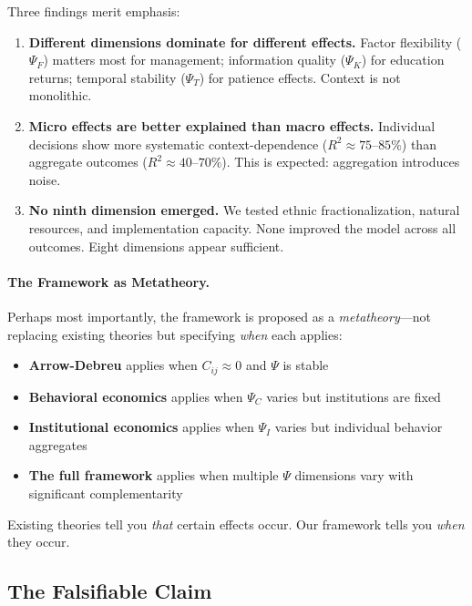 Three findings merit emphasis:
\begin{enumerate}
    \item \textbf{Different dimensions dominate for different effects.} Factor flexibility ($\Psi_F$) matters most for management; information quality ($\Psi_K$) for education returns; temporal stability ($\Psi_T$) for patience effects. Context is not monolithic.
    
    \item \textbf{Micro effects are better explained than macro effects.} Individual decisions show more systematic context-dependence ($R^2 \approx 75$--$85\%$) than aggregate outcomes ($R^2 \approx 40$--$70\%$). This is expected: aggregation introduces noise.
    
    \item \textbf{No ninth dimension emerged.} We tested ethnic fractionalization, natural resources, and implementation capacity. None improved the model across all outcomes. Eight dimensions appear sufficient.
\end{enumerate}

\paragraph{The Framework as Metatheory.}
Perhaps most importantly, the framework is proposed as a \emph{metatheory}---not replacing existing theories but specifying \emph{when} each applies:

\begin{itemize}
  \item \textbf{Arrow-Debreu} applies when $C_{ij} \approx 0$ and $\Psi$ is stable
  \item \textbf{Behavioral economics} applies when $\Psi_C$ varies but institutions are fixed
  \item \textbf{Institutional economics} applies when $\Psi_I$ varies but individual behavior aggregates
  \item \textbf{The full framework} applies when multiple $\Psi$ dimensions vary with significant complementarity
\end{itemize}

Existing theories tell you \emph{that} certain effects occur. Our framework tells you \emph{when} they occur.

\subsection{The Falsifiable Claim}

